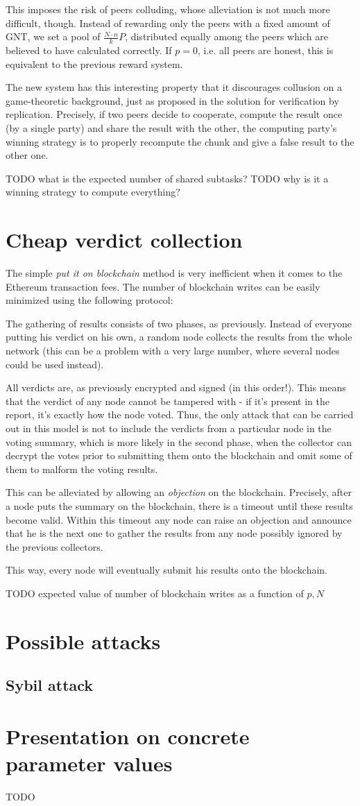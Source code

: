 \documentclass[12pt]{article}
\begin{document}
This imposes the risk of peers colluding, whose alleviation is not much more difficult,
though. Instead of rewarding only the peers with a fixed amount of GNT, we set a pool
of $\frac{N \cdot n}{k} P$, distributed equally among the peers which are believed to have
calculated correctly. If $p = 0$, i.e. all peers are honest, this is equivalent to 
the previous reward system. 

The new system has this interesting property that it discourages collusion on a
game-theoretic background, just as proposed in the solution for verification by
replication. Precisely, if two peers decide to cooperate, compute the result once
(by a single party) and share the result with the other, the computing party's 
winning strategy is to properly recompute the chunk and give a false result to 
the other one. 

TODO what is the expected number of shared subtasks?
TODO why is it a winning strategy to compute everything?

\section{Cheap verdict collection}
The simple \textit{put it on blockchain} method is very inefficient when it 
comes to the Ethereum transaction fees. The number of blockchain writes
can be easily minimized using the following protocol:

The gathering of results consists of two phases, as previously. Instead of 
everyone putting his verdict on his own, a random node collects the results 
from the whole network (this can be a problem with a very large number, where
several nodes could be used instead).

All verdicts are, as previously encrypted and signed (in this order!). This
means that the verdict of any node cannot be tampered with - if it's present
in the report, it's exactly how the node voted. Thus, the only attack that
can be carried out in this model is not to include the verdicts from a
particular node in the voting summary, which is more likely in the second
phase, when the collector can decrypt the votes prior to submitting them 
onto the blockchain and omit some of them to malform the voting results.

This can be alleviated by allowing an \textit{objection} on the blockchain.
Precisely, after a node puts the summary on the blockchain, there is a 
timeout until these results become valid. Within this timeout any node can
raise an objection and announce that he is the next one to gather the results
from any node possibly ignored by the previous collectors.

This way, every node will eventually submit his results onto the blockchain.

TODO expected value of number of blockchain writes as a function of 
$p, N$
\section{Possible attacks}
\subsection{Sybil attack}
 
\section{Presentation on concrete parameter values}
TODO
\end{document}
